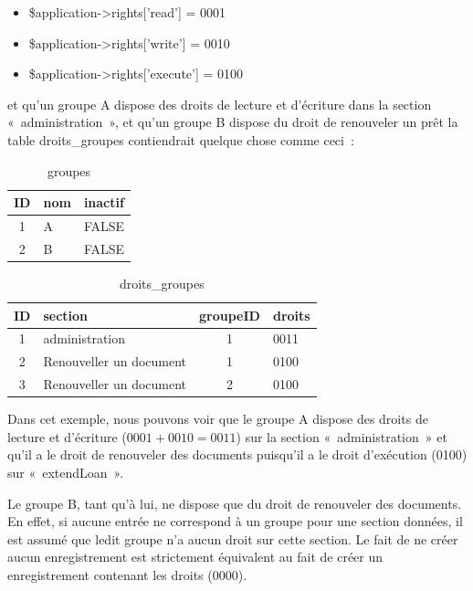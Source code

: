 \documentclass[letter, 11pt]{report}
\begin{document}
\begin{itemize}
	\item \$application->rights['read'] = 0001
	\item \$application->rights['write'] = 0010
	\item \$application->rights['execute'] = 0100
\end{itemize}

et qu'un groupe A dispose des droits de lecture et d'écriture dans la section «~administration~», et qu'un groupe B dispose du droit de renouveler un prêt la table droits\_groupes contiendrait quelque chose comme ceci~:

\begin{table}[ht]
	\caption{groupes}
	\begin{center}
		\begin{tabular}{|c|l|l|}
			\hline
			ID & nom & inactif \\
			\hline
			1  & A   & FALSE \\
			2  & B   & FALSE \\
			\hline
		\end{tabular}
	\end{center}
\end{table}

\begin{table}[h!]
	\caption{droits\_groupes}
	\begin{center}
		\begin{tabular}{|c|l|c|l|}
			\hline
			ID & section                 & groupeID & droits \\
			\hline
			1  & administration          & 1        & 0011 \\
			2  & Renouveller un document & 1        & 0100 \\
			3  & Renouveller un document & 2        & 0100 \\
			\hline
		\end{tabular}
	\end{center}
\end{table}

Dans cet exemple, nous pouvons voir que le groupe A dispose des droits de lecture et d'écriture ($ 0001 + 0010 = 0011 $) sur la section «~administration~» et qu'il a le droit de renouveler des documents puisqu'il a le droit d'exécution (0100) sur «~extendLoan~».

Le groupe B, tant qu'à lui, ne dispose que du droit de renouveler des documents. En effet, si aucune entrée ne correspond à un groupe pour une section données, il est assumé que ledit groupe n'a aucun droit sur cette section. Le fait de ne créer aucun enregistrement est strictement équivalent au fait de créer un enregistrement contenant les droits (0000).
\end{document}
